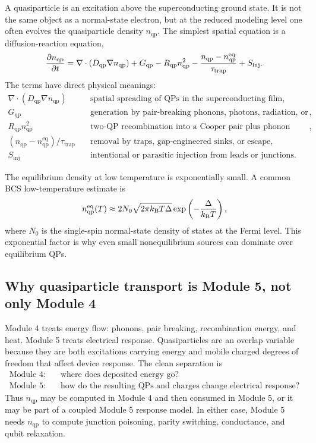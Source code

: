 \documentclass[11pt]{article}
\newcommand{\DeltaSC}{\Delta}
\newcommand{\nqp}{n_{\mathrm{qp}}}
\newcommand{\Nzero}{N_0}
\newcommand{\Dqp}{D_{\mathrm{qp}}}
\newcommand{\Gqp}{G_{\mathrm{qp}}}
\newcommand{\Rqp}{R_{\mathrm{qp}}}
\newcommand{\tautrap}{\tau_{\mathrm{trap}}}
\begin{document}
A quasiparticle is an excitation above the superconducting ground state. It is not the same object as a normal-state electron, but at the reduced modeling level one often evolves the quasiparticle density \(\nqp\). The simplest spatial equation is a diffusion-reaction equation,
\begin{equation}
\pdv{\nqp}{t} = \nabla\cdot(\Dqp\nabla\nqp)+\Gqp-\Rqp\nqp^2-\frac{\nqp-\nqp^{\mathrm{eq}}}{\tautrap}+S_{\mathrm{inj}}.
\label{eq:nqp_diffusion}
\end{equation}
The terms have direct physical meanings:
\begin{align}
\nabla\cdot(\Dqp\nabla\nqp) &\quad \text{spatial spreading of QPs in the superconducting film},\\
\Gqp &\quad \text{generation by pair-breaking phonons, photons, radiation, or injection},\\
\Rqp\nqp^2 &\quad \text{two-QP recombination into a Cooper pair plus phonon energy},\\
(\nqp-\nqp^{\mathrm{eq}})/\tautrap &\quad \text{removal by traps, gap-engineered sinks, or escape},\\
S_{\mathrm{inj}} &\quad \text{intentional or parasitic injection from leads or junctions}.
\end{align}

The equilibrium density at low temperature is exponentially small. A common BCS low-temperature estimate is
\begin{equation}
\nqp^{\mathrm{eq}}(T) \approx 2\Nzero\sqrt{2\pi \kB T\DeltaSC}\exp\left(-\frac{\DeltaSC}{\kB T}\right),
\label{eq:nqp_eq}
\end{equation}
where \(\Nzero\) is the single-spin normal-state density of states at the Fermi level. This exponential factor is why even small nonequilibrium sources can dominate over equilibrium QPs.

\subsection{Why quasiparticle transport is Module 5, not only Module 4}

Module 4 treats energy flow: phonons, pair breaking, recombination energy, and heat. Module 5 treats electrical response. Quasiparticles are an overlap variable because they are both excitations carrying energy and mobile charged degrees of freedom that affect device response. The clean separation is
\begin{align}
\text{Module 4:} \quad & \text{where does deposited energy go?}\\
\text{Module 5:} \quad & \text{how do the resulting QPs and charges change electrical response?}
\end{align}
Thus \(\nqp\) may be computed in Module 4 and then consumed in Module 5, or it may be part of a coupled Module 5 response model. In either case, Module 5 needs \(\nqp\) to compute junction poisoning, parity switching, conductance, and qubit relaxation.
\end{document}
